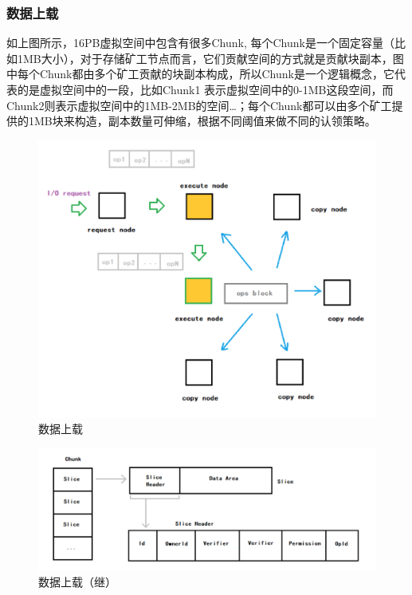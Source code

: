 \documentclass[a4paper,12pt]{article}
\begin{document}
\subsubsection{数据上载}

如上图所示，16PB虚拟空间中包含有很多Chunk, 每个Chunk是一个固定容量（比如1MB大小），对于存储矿工节点而言，它们贡献空间的方式就是贡献块副本，图中每个Chunk都由多个矿工贡献的块副本构成，所以Chunk是一个逻辑概念，它代表的是虚拟空间中的一段，比如Chunk1 表示虚拟空间中的0-1MB这段空间，而Chunk2则表示虚拟空间中的1MB-2MB的空间…；每个Chunk都可以由多个矿工提供的1MB块来构造，副本数量可伸缩，根据不同阈值来做不同的认领策略。


\begin {figure} [htbp]
\centering \includegraphics [width = 5in] {pic_cn/data_upload1.png}
\caption {数据上载} \label {fig: d7}
\end {figure}


\begin {figure} [htbp]
\centering \includegraphics [width = 5in] {pic_cn/data_upload2.png}
\caption {数据上载（继）} \label {fig: d8}
\end {figure}
\end{document}
